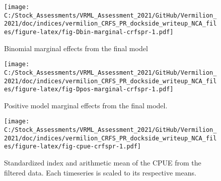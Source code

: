 \documentclass[
]{article}
\begin{document}
\begin{figure}
\centering
\texttt{[image: C:/Stock\_Assessments/VRML\_Assessment\_2021/GitHub/Vermilion\_2021/doc/indices/vermilion\_CRFS\_PR\_dockside\_writeup\_NCA\_files/figure-latex/fig-Dbin-marginal-crfspr-1.pdf]}
\caption{\label{fig:fig-Dbin-marginal-crfspr}Binomial marginal effects from the final model}
\end{figure}

\begin{figure}
\centering
\texttt{[image: C:/Stock\_Assessments/VRML\_Assessment\_2021/GitHub/Vermilion\_2021/doc/indices/vermilion\_CRFS\_PR\_dockside\_writeup\_NCA\_files/figure-latex/fig-Dpos-marginal-crfspr-1.pdf]}
\caption{\label{fig:fig-Dpos-marginal-crfspr}Positive model marginal effects from the final model.}
\end{figure}

\begin{figure}
\centering
\texttt{[image: C:/Stock\_Assessments/VRML\_Assessment\_2021/GitHub/Vermilion\_2021/doc/indices/vermilion\_CRFS\_PR\_dockside\_writeup\_NCA\_files/figure-latex/fig-cpue-crfspr-1.pdf]}
\caption{\label{fig:fig-cpue-crfspr}Standardized index and arithmetic mean of the CPUE from the filtered data. Each timeseries is scaled to its respective means.}
\end{figure}
\end{document}
